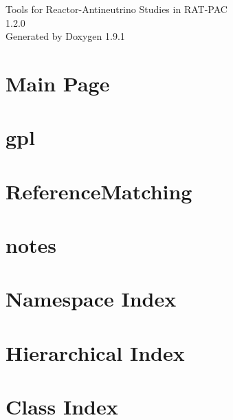\let\mypdfximage\pdfximage\def\pdfximage{\immediate\mypdfximage}\documentclass[twoside]{book}
\newcommand{\+}{\discretionary{\mbox{\scriptsize$\hookleftarrow$}}{}{}}
\newcommand{\clearemptydoublepage}{%
  \newpage{\pagestyle{empty}\cleardoublepage}%
}
\begin{document}
\raggedbottom

\hypersetup{pageanchor=false,
             bookmarksnumbered=true,
             pdfencoding=unicode
            }
\begin{titlepage}
\vspace*{7cm}
\begin{center}%
{\Large Tools for Reactor-\/\+Antineutrino Studies in RAT-\/\+PAC \\[1ex]\large 1.\+2.\+0 }\\
\vspace*{1cm}
{\large Generated by Doxygen 1.9.1}\\
\end{center}
\end{titlepage}
\clearemptydoublepage
{}
\tableofcontents
\clearemptydoublepage
{}
\hypersetup{pageanchor=true}

\chapter{Main Page}
\label{index}\hypertarget{index}{}
\chapter{gpl}
\label{md_gpl}

\chapter{Reference\+Matching}
\label{md_ReferenceMatching}

\chapter{notes}
\label{md_geant4_notes}

\chapter{Namespace Index}

\chapter{Hierarchical Index}

\chapter{Class Index}

\end{document}
